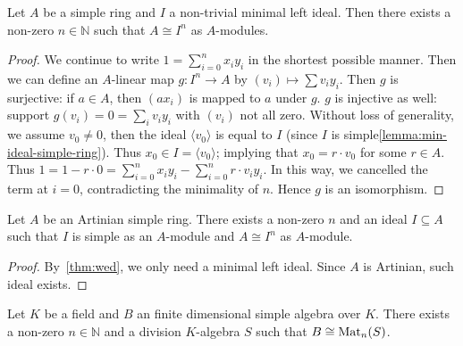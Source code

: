\begin{theorem}[Wedderburn]\label{thm:wed}
  Let $A$ be a simple ring and $I$ a non-trivial minimal left ideal. Then there
  exists a non-zero $n \in \mathbb{N}$ such that $A \cong I^{n}$ as $A$-modules.
  \leanok
\end{theorem}

\begin{proof}
  We continue to write $1 = \sum_{i=0}^{n}x_{i}y_{i}$ in the shortest possible
  manner. Then we can define an $A$-linear map $g : I^{n}\to A$ by
  $(v_{i})\mapsto \sum v_{i}y_{i}$. Then $g$ is surjective: if $a \in A$, then
  $(ax_{i})$ is mapped to $a$ under $g$. $g$ is injective as well: support
  $g(v_{i})=0=\sum_{i}v_{i}y_{i}$ with $(v_{i})$ not all zero. Without loss of
  generality, we assume $v_{0} \ne 0$, then the ideal $\langle v_{0}\rangle$ is
  equal to $I$ (since $I$ is simple\cref{lemma:min-ideal-simple-ring}). Thus
  $x_{0}\in I = \langle v_{0}\rangle$; implying that $x_{0}=r\cdot v_{0}$ for
  some $r\in A$. Thus
  $1=1 - r\cdot 0 = \sum_{i=0}^{n}x_{i}y_{i}-\sum_{i=0}^{n}r\cdot v_{i}y_{i}$.
  In this way, we cancelled the term at $i=0$, contradicting the minimality of
  $n$. Hence $g$ is an isomorphism.
\end{proof}

\begin{theorem}
  Let $A$ be an Artinian simple ring. There exists a non-zero $n$ and an ideal
  $I \subseteq A$ such that $I$ is simple as an $A$-module and $A \cong I^{n}$
  as $A$-module.
  \label{thm:wed-artin-ideal}
  \leanok
\end{theorem}

\begin{proof}
  By~\cref{thm:wed}, we only need a minimal left ideal. Since $A$ is Artinian,
  such ideal exists.
\end{proof}

\begin{theorem} \label{thm:wed-artin-algebra}
 Let $K$ be a field and $B$ an finite dimensional simple algebra over $K$.
  There exists a non-zero $n\in\mathbb{N}$ and a division $K$-algebra $S$ such
  that $B \cong \operatorname{Mat}_{n}(S)$.
  \leanok
\end{theorem}

